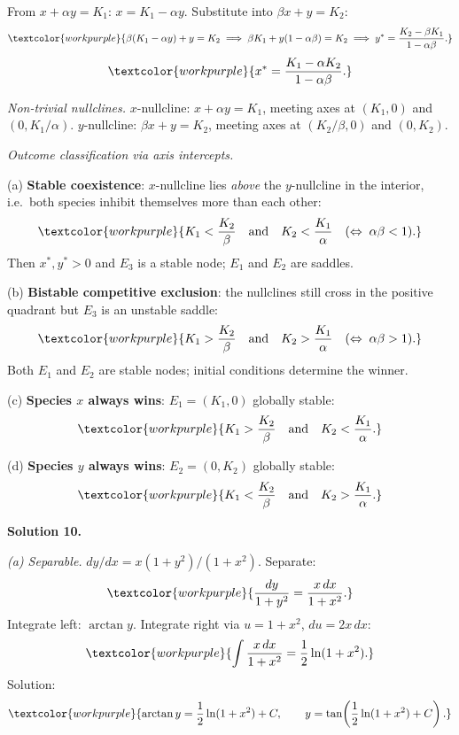 From $x + \alpha y = K_1$: $x = K_1 - \alpha y$.
Substitute into $\beta x + y = K_2$:
\[
  \textcolor{workpurple}{\beta(K_1 - \alpha y) + y = K_2
  \;\Longrightarrow\;
  \beta K_1 + y(1 - \alpha\beta) = K_2
  \;\Longrightarrow\;
  y^* = \frac{K_2 - \beta K_1}{1 - \alpha\beta}.}
\]
\[
  \textcolor{workpurple}{x^* = \frac{K_1 - \alpha K_2}{1 - \alpha\beta}.}
\]

\textit{Non-trivial nullclines.}
$x$-nullcline: $x + \alpha y = K_1$, meeting axes at $(K_1, 0)$ and $(0, K_1/\alpha)$.
$y$-nullcline: $\beta x + y = K_2$, meeting axes at $(K_2/\beta, 0)$ and $(0, K_2)$.

\textit{Outcome classification via axis intercepts.}

\noindent(a) \textbf{Stable coexistence}: $x$-nullcline lies \emph{above} the $y$-nullcline in the
interior, i.e.\ both species inhibit themselves more than each other:
\[
  \textcolor{workpurple}{K_1 < \frac{K_2}{\beta}
  \quad\text{and}\quad
  K_2 < \frac{K_1}{\alpha}
  \quad(\Leftrightarrow\;\alpha\beta < 1).}
\]
Then $x^*, y^* > 0$ and $E_3$ is a stable node; $E_1$ and $E_2$ are saddles.

\noindent(b) \textbf{Bistable competitive exclusion}: the nullclines still cross in the positive
quadrant but $E_3$ is an unstable saddle:
\[
  \textcolor{workpurple}{K_1 > \frac{K_2}{\beta}
  \quad\text{and}\quad
  K_2 > \frac{K_1}{\alpha}
  \quad(\Leftrightarrow\;\alpha\beta > 1).}
\]
Both $E_1$ and $E_2$ are stable nodes; initial conditions determine the winner.

\noindent(c) \textbf{Species $x$ always wins}: $E_1 = (K_1, 0)$ globally stable:
\[
  \textcolor{workpurple}{K_1 > \frac{K_2}{\beta}
  \quad\text{and}\quad
  K_2 < \frac{K_1}{\alpha}.}
\]

\noindent(d) \textbf{Species $y$ always wins}: $E_2 = (0, K_2)$ globally stable:
\[
  \textcolor{workpurple}{K_1 < \frac{K_2}{\beta}
  \quad\text{and}\quad
  K_2 > \frac{K_1}{\alpha}.}
\]

\medskip

\noindent\textbf{Solution 10.}\quad

\noindent\textit{(a) Separable.}
$dy/dx = x(1+y^2)/(1+x^2)$. Separate:
\[
  \textcolor{workpurple}{\frac{dy}{1+y^2} = \frac{x\,dx}{1+x^2}.}
\]
Integrate left: $\arctan y$. Integrate right via $u = 1+x^2$,
$du = 2x\,dx$:
\[
  \textcolor{workpurple}{\int\frac{x\,dx}{1+x^2} = \frac{1}{2}\ln(1+x^2).}
\]
Solution:
\[
  \textcolor{workpurple}{\arctan y = \frac{1}{2}\ln(1+x^2) + C,
  \qquad y = \tan\!\left(\frac{1}{2}\ln(1+x^2) + C\right).}
\]

